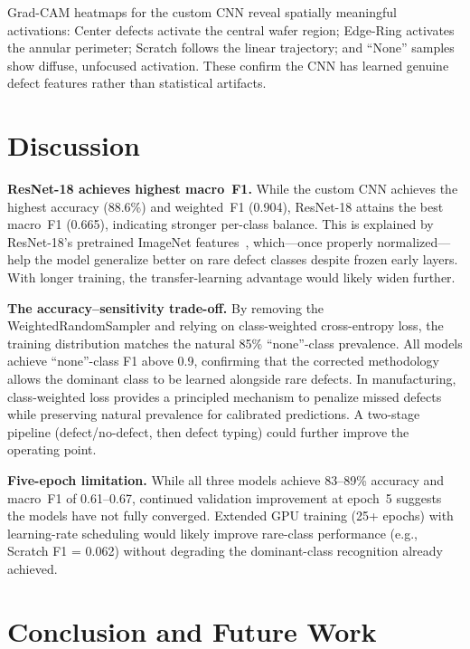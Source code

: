 \documentclass[conference]{IEEEtran}
\begin{document}
Grad-CAM heatmaps for the custom CNN reveal spatially meaningful activations:
Center defects activate the central wafer region; Edge-Ring activates the
annular perimeter; Scratch follows the linear trajectory; and ``None'' samples
show diffuse, unfocused activation. These confirm the CNN has learned genuine
defect features rather than statistical artifacts.

\section{Discussion}
\label{sec:discussion}

\textbf{ResNet-18 achieves highest macro~F1.}
While the custom CNN achieves the highest accuracy (88.6\%) and weighted~F1
(0.904), ResNet-18 attains the best macro~F1 (0.665), indicating stronger
per-class balance. This is explained by ResNet-18's pretrained ImageNet
features~\cite{pan2010,yosinski2014}, which---once properly normalized---help
the model generalize better on rare defect classes despite frozen early
layers. With longer training, the transfer-learning advantage would likely
widen further.

\textbf{The accuracy--sensitivity trade-off.}
By removing the WeightedRandomSampler and relying on class-weighted
cross-entropy loss, the training distribution matches the natural 85\%
``none''-class prevalence. All models achieve ``none''-class F1 above 0.9,
confirming that the corrected methodology allows the dominant class to be
learned alongside rare defects. In manufacturing, class-weighted loss
provides a principled mechanism to penalize missed defects while preserving
natural prevalence for calibrated predictions. A two-stage pipeline
(defect/no-defect, then defect typing) could further improve the operating
point.

\textbf{Five-epoch limitation.}
While all three models achieve 83--89\% accuracy and macro~F1 of 0.61--0.67,
continued validation improvement at epoch~5 suggests the models have not
fully converged. Extended GPU training (25+ epochs) with learning-rate
scheduling would likely improve rare-class performance (e.g., Scratch
F1 = 0.062) without degrading the dominant-class recognition already
achieved.

\section{Conclusion and Future Work}
\label{sec:conclusion}
\end{document}
